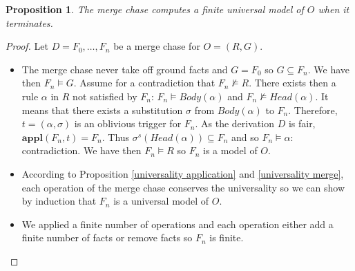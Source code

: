 \documentclass{article}
\newtheorem{proposition}{Proposition}[section]
\theoremstyle{definition}
\newtheorem{definition}{Definition}[section]
\theoremstyle{remark}
\def \N {\mathbb N}
\newcommand{\Vars}{\textbf{Vars}}
\newcommand{\Appl}{\textbf{appl}}
\begin{document}




\begin{proposition}
The merge chase computes a finite universal model of $O$ when it terminates.
\end{proposition}

\begin{proof}
Let $D = F_0,\ldots,F_n$ be a merge chase for $O =(R,G)$. 
\begin{itemize}
\item The merge chase never take off ground facts and $G =F_0$ so $G \subseteq F_n$. We have then $F_n \models G$. Assume for a contradiction that $F_n \nvDash R$. There exists then a rule $\alpha$ in $R$ not satisfied by $F_n$: $F_n \vDash \textit{Body}(\alpha)$ and $F_n \nvDash \textit{Head}(\alpha)$. It means that there exists a substitution $\sigma$ from $\textit{Body}(\alpha)$ to $F_n$. Therefore, $t=(\alpha,\sigma)$ is an oblivious trigger for $F_n$. As the derivation $D$ is fair, $\Appl(F_n,t) = F_n$. Thus $\sigma^s(\textit{Head}(\alpha)) \subseteq F_n$ and so $F_n \models \alpha$: contradiction. We have then $F_n \models R$ so $F_n$ is a model of $O$.
\item According to Proposition \ref{universality application} and \ref{universality merge}, each operation of the merge chase conserves the universality so we can show by induction that $F_n$ is a universal model of $O$.
\item We applied a finite number of operations and each operation either add a finite number of facts or remove facts so $F_n$ is finite.
\end{itemize}
\end{proof}
\end{document}
